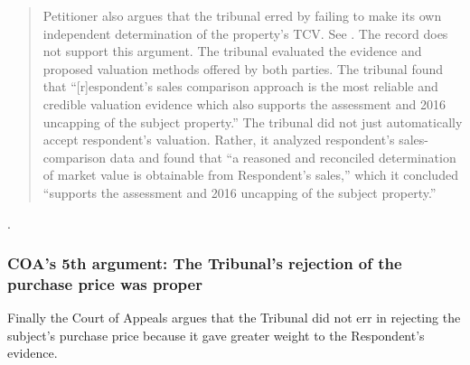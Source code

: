 \documentclass[12pt,\documentclassflag]{michiganCourtOfAppealsBrief}
\begin{document}
\begin{quotation}
  Petitioner also argues that the tribunal erred by failing to make its own independent
determination of the property's TCV. See .
The record does not support this argument. The
tribunal evaluated the evidence and proposed valuation methods offered by both parties. The
tribunal found that ``[r]espondent's sales comparison approach is the most reliable and credible
valuation evidence which also supports the assessment and 2016 uncapping of the subject
property.'' The tribunal did not just automatically accept respondent's valuation. Rather, it
analyzed respondent's sales-comparison data and found that ``a reasoned and reconciled
determination of market value is obtainable from Respondent's sales,'' which it concluded
``supports the assessment and 2016 uncapping of the subject property.''
\end{quotation}
.

\subsubsection{COA's 5th argument: The Tribunal's rejection of the purchase price was proper}

Finally the Court of Appeals argues that the Tribunal did not err in rejecting the subject's purchase price because it gave greater weight to the Respondent's evidence.
\end{document}
